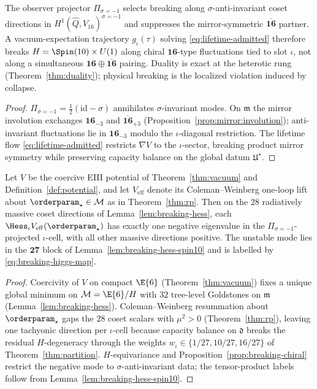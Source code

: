 \begin{proposition}\label{prop:breaking-chiral}
The observer projector $\Pi_{\sigma=-1}$ selects breaking along
$\sigma$-anti-invariant coset directions in
$H^1(\hat Q,V_{16})^{\sigma=-1}$ and suppresses the mirror-symmetric
$\overline{\mathbf{16}}$ partner. A vacuum-expectation trajectory $g_\iota(\tau)$
solving \eqref{eq:lifetime-admitted} therefore breaks
$H=\Spin(10)\times U(1)$ along chiral $\mathbf{16}$-type fluctuations tied to
slot $\iota$, not along a simultaneous
$\mathbf{16}\oplus\overline{\mathbf{16}}$ pairing. Duality is exact at the
heterotic rung (Theorem~\ref{thm:duality}); physical breaking is the localized
violation induced by collapse.
\end{proposition}

\begin{proof}
$\Pi_{\sigma=-1}=\tfrac12(\mathrm{id}-\sigma)$ annihilates $\sigma$-invariant
modes. On $\mathfrak{m}$ the mirror involution exchanges
$\mathbf{16}_{-3}$ and $\overline{\mathbf{16}}_{+3}$
(Proposition~\ref{prop:mirror:involution}); anti-invariant fluctuations lie in
$\mathbf{16}_{-3}$ modulo the $\iota$-diagonal restriction. The lifetime flow
\eqref{eq:lifetime-admitted} restricts $\nabla V$ to the $\iota$-sector,
breaking product mirror symmetry while preserving capacity balance on the global
datum $\mathfrak{U}^\star$.
\end{proof}

\begin{lemma}
\label{lem:breaking-cw}
Let $V$ be the coercive EIII potential of Theorem~\ref{thm:vacuum}
and Definition~\ref{def:potential}, and let $V_{\mathrm{eff}}$ denote its Coleman--Weinberg
one-loop lift about $\orderparam_\star\in\mathcal{M}$ as in
Theorem~\ref{thm:rp}. Then on the $28$ radiatively massive coset directions of
Lemma~\ref{lem:breaking-hess}, each $\Hess_\iota V_{\mathrm{eff}}(\orderparam_\star)$
has exactly one negative eigenvalue in the
$\Pi_{\sigma=-1}$-projected $\iota$-cell, with all other massive directions
positive. The unstable mode lies in the $\mathbf{27}$ block of
Lemma~\ref{lem:breaking-hess-spin10} and is labelled by
\eqref{eq:breaking-higgs-map}.
\end{lemma}

\begin{proof}
Coercivity of $V$ on compact $\E{6}$ (Theorem~\ref{thm:vacuum}) fixes a unique
global minimum on $\mathcal{M}=\E{6}/H$ with $32$ tree-level Goldstones on
$\mathfrak{m}$ (Lemma~\ref{lem:breaking-hess}). Coleman--Weinberg resummation
about $\orderparam_\star$ gaps the $28$ coset scalars with $\mu^2>0$
(Theorem~\ref{thm:rp}), leaving one tachyonic direction per $\iota$-cell because
capacity balance on $\mathfrak{d}$ breaks the residual $H$-degeneracy through
the weights $w_\iota\in\{1/27,10/27,16/27\}$ of Theorem~\ref{thm:partition}.
$H$-equivariance and Proposition~\ref{prop:breaking-chiral} restrict the
negative mode to $\sigma$-anti-invariant data; the tensor-product labels follow
from Lemma~\ref{lem:breaking-hess-spin10}.
\end{proof}

